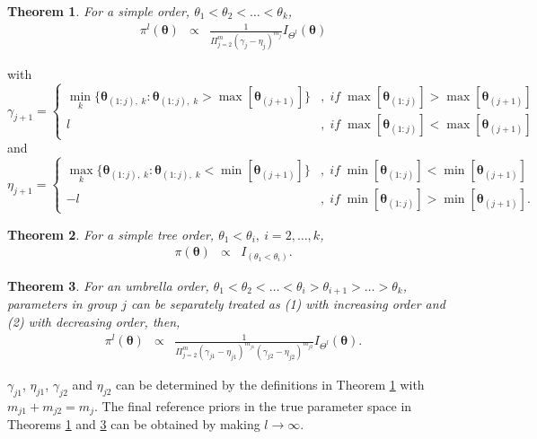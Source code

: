\documentclass[Proceedings]{ascelike}
\newtheorem{thm}{Theorem}
\begin{document}
\begin{thm}
\label{theorem1}
For a simple order, $\theta_1<\theta_2<\hdots<\theta_k$,
\begin{eqnarray}
\pi^{l}(\boldsymbol{\theta})
& \propto &
\frac{1}{\Pi_{j=2}^{m}(\gamma_j-\eta_j)^{m_j}}I_{\Theta^{l}}(\boldsymbol{\theta})\nonumber
\end{eqnarray}
\end{thm}
with
\begin{displaymath}
\gamma_{j+1} = \left\{
\begin{array}{lr}
\min\limits_{k}\{\boldsymbol{\theta}_{(1:j),\;k}:\boldsymbol{\theta}_{(1:j),\;k}>\max[\boldsymbol{\theta}_{(j+1)}]\} &,\; if\; \max[\boldsymbol{\theta}_{(1:j)}]> \max[\boldsymbol{\theta}_{(j+1)}]\\
l &,\; if\; \max[\boldsymbol{\theta}_{(1:j)}]< \max[\boldsymbol{\theta}_{(j+1)}]
\end{array}
\right.
\end{displaymath} 
and
\begin{displaymath}
\eta_{j+1} = \left\{
\begin{array}{lr}
\max\limits_{k}\{\boldsymbol{\theta}_{(1:j),\;k}:\boldsymbol{\theta}_{(1:j),\;k}<\min[\boldsymbol{\theta}_{(j+1)}]\} &,\; if\; \min[\boldsymbol{\theta}_{(1:j)}]< \min[\boldsymbol{\theta}_{(j+1)}]\\
-l &,\; if\; \min[\boldsymbol{\theta}_{(1:j)}]> \min[\boldsymbol{\theta}_{(j+1)}].
\end{array}
\right.
\end{displaymath} 
\begin{thm}
\label{theorem2}
For a simple tree order, $\theta_1<\theta_i,\ i=2,\hdots,k$,
\begin{eqnarray}
\pi(\boldsymbol{\theta})
& \propto &
I_{(\theta_1<\theta_i)}.\nonumber
\end{eqnarray}
\end{thm}
\begin{thm} 
\label{theorem3}
For an umbrella order,
$\theta_1<\theta_2<\hdots<\theta_i>\theta_{i+1}>\hdots>\theta_k$,
parameters in group $j$ can be separately treated as (1) with
increasing order and (2) with decreasing order, then,
\begin{eqnarray}
\pi^{l}(\boldsymbol{\theta}) & \propto &
\frac{1}{\Pi_{j=2}^{m}(\gamma_{j1}-\eta_{j1})^{m_{j1}}(\gamma_{j2}-\eta_{j2})^{m_{j2}}}I_{\Theta^{l}}(\boldsymbol{\theta}).\nonumber
\end{eqnarray}
\end{thm}
$\gamma_{j1}$, $\eta_{j1}$, $\gamma_{j2}$ and $\eta_{j2}$ can be
determined by the definitions in Theorem \ref{theorem1} with
$m_{j1}+m_{j2}=m_j$. The final reference priors in the true parameter
space in Theorems \ref{theorem1} and \ref{theorem3} can be obtained by
making $l\to\infty$.
\end{document}
